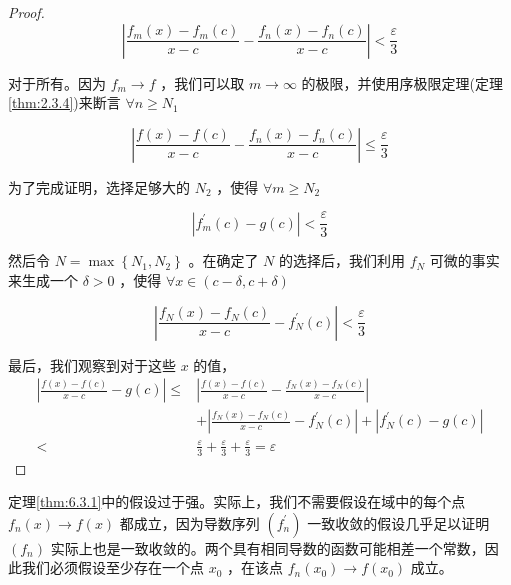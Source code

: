 \begin{proof}
\[
\left| {\frac{{f}_{m}\left( x\right)  - {f}_{m}\left( c\right) }{x - c} - \frac{{f}_{n}\left( x\right)  - {f}_{n}\left( c\right) }{x - c}}\right|  < \frac{\varepsilon }{3}
\]

对于所有。因为 \({f}_{m} \rightarrow  f\) ，我们可以取 \(m \rightarrow  \infty\) 的极限，并使用序极限定理(定理\ref{thm:2.3.4})来断言 $\forall n\ge N_1$

\[
\left| {\frac{f\left( x\right)  - f\left( c\right) }{x - c} - \frac{{f}_{n}\left( x\right)  - {f}_{n}\left( c\right) }{x - c}}\right|  \leq  \frac{\varepsilon }{3}
\]

为了完成证明，选择足够大的 \({N}_{2}\) ，使得 $\forall m\ge N_2$

\[
\left| {{f}_{m}^{\prime }\left( c\right)  - g\left( c\right) }\right|  < \frac{\varepsilon }{3}
\]

然后令 \(N = \max \left\{  {{N}_{1},{N}_{2}}\right\}\) 。在确定了 \(N\) 的选择后，我们利用 \({f}_{N}\) 可微的事实来生成一个 \(\delta  > 0\) ，使得 $\forall x\in (c-\delta, c+\delta)$

\[
\left| {\frac{{f}_{N}\left( x\right)  - {f}_{N}\left( c\right) }{x - c} - {f}_{N}^{\prime }\left( c\right) }\right|  < \frac{\varepsilon }{3}
\]

最后，我们观察到对于这些 \(x\) 的值，
\begin{align*}
\left| {\frac{f\left( x\right)  - f\left( c\right) }{x - c} - g\left( c\right) }\right|  \leq & \left| {\frac{f\left( x\right)  - f\left( c\right) }{x - c} - \frac{{f}_{N}\left( x\right)  - {f}_{N}\left( c\right) }{x - c}}\right|\\
& + \left| {\frac{{f}_{N}\left( x\right)  - {f}_{N}\left( c\right) }{x - c} - {f}_{N}^{\prime }\left( c\right) }\right|  + \left| {{f}_{N}^{\prime }\left( c\right)  - g\left( c\right) }\right|\\
< & \frac{\varepsilon }{3} + \frac{\varepsilon }{3} + \frac{\varepsilon }{3} = \varepsilon
\end{align*}

  
\end{proof}

定理\ref{thm:6.3.1}中的假设过于强。实际上，我们不需要假设在域中的每个点 \({f}_{n}\left( x\right)  \rightarrow  f\left( x\right)\) 都成立，因为导数序列 \(\left( {f}_{n}^{\prime }\right)\) 一致收敛的假设几乎足以证明 \(\left( {f}_{n}\right)\) 实际上也是一致收敛的。两个具有相同导数的函数可能相差一个常数，因此我们必须假设至少存在一个点 \({x}_{0}\) ，在该点 \({f}_{n}\left( {x}_{0}\right)  \rightarrow  f\left( {x}_{0}\right)\) 成立。


